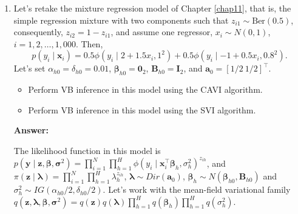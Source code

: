\begin{enumerate}[leftmargin=*]
\item Let's retake the mixture regression model of Chapter \ref{chap11}, that is, the simple regression mixture with two components such that $z_{i1}\sim \text{Ber}(0.5)$, consequently, $z_{i2}=1-z_{i1}$, and assume one regressor, $x_i\sim N(0,1)$, $i=1,2,\dots,1,000$. Then, 
$$p(y_i \mid \boldsymbol{x}_i) = 
0.5 \phi(y_i \mid 2+1.5x_i,1^2)+0.5 \phi(y_i \mid -1+0.5x_i,0.8^2).$$
Let's set $\alpha_{h0}=\delta_{h0}=0.01$, $\boldsymbol{\beta}_{h0}=\boldsymbol{0}_2$, $\boldsymbol{B}_{h0}=\boldsymbol{I}_2$, and $\boldsymbol{a}_0=[1/2 \ 1/2]^{\top}$.

\begin{itemize}
	\item Perform VB inference in this model using the CAVI algorithm.
	\item Perform VB inference in this model using the SVI algorithm.
\end{itemize}

\textbf{Answer:}

The likelihood function in this model is $p(\bm{y}\mid \bm{z},\bm{\beta},\bm{\sigma}^2)=\prod_{i=1}^N\prod_{h=1}^H\phi(y_i\mid\bm{x}_i^{\top}\bm{\beta}_h,\sigma_h^2)^{z_{ih}}$, and $\pi(\bm{z}\mid\bm{\lambda})=\prod_{i=1}^N\prod_{h=1}^H\lambda_h^{z_{ih}}$, $\bm{\lambda}\sim Dir(\bm{a}_0)$, $\bm{\beta}_h\sim N(\bm{\beta}_{h0},\bm{B}_{h0})$ and $\sigma_h^2\sim IG(\alpha_{h0}/2,\delta_{h0}/2)$. Let's work with the mean-field variational family $q(\bm{z},\bm{\lambda},\bm{\beta},\bm{\sigma}^2)=q(\bm{z})q(\bm{\lambda})\prod_{h=1}^H q(\bm{\beta}_h)\prod_{h=1}^H q({\sigma}^2_h)$.


\end{enumerate}
